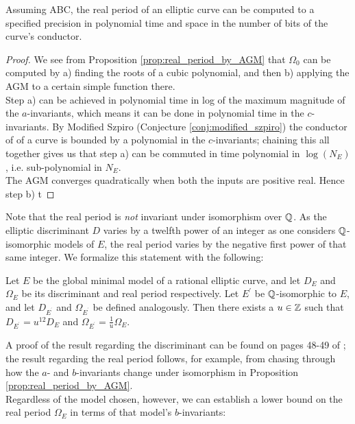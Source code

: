 \documentclass[10pt]{article}
\newcommand{\pr}{^{\prime}}
\begin{document}
\begin{corollary}
Assuming ABC, the real period of an elliptic curve can be computed to a specified precision in polynomial time and space in the number of bits of the curve's conductor.
\end{corollary}
\begin{proof}
We see from Proposition \ref{prop:real_period_by_AGM} that $\Omega_0$ can be computed by a) finding the roots of a cubic polynomial, and then b) applying the AGM to a certain simple function there. \\

Step a) can be achieved in polynomial time in log of the maximum magnitude of the $a$-invariants, which means it can be done in polynomial time in the $c$-invariants. By Modified Szpiro (Conjecture \ref{conj:modified_szpiro}) the conductor of of a curve is bounded by a polynomial in the $c$-invariants; chaining this all together gives us that step a) can be commuted in time polynomial in $\log(N_E)$, i.e. sub-polynomial in $N_E$. \\

The AGM converges quadratically when both the inputs are positive real. Hence step b) t
\end{proof}



Note that the real period is {\it not} invariant under isomorphism over $\mathbb{Q}$. As the elliptic discriminant $D$ varies by a twelfth power of an integer as one considers $\mathbb{Q}$-isomorphic models of $E$, the real period varies by the negative first power of that same integer. We formalize this statement with the following:
\begin{lemma}
Let $E$ be the global minimal model of a rational elliptic curve, and let $D_E$ and $\Omega_E$ be its discriminant and real period respectively. Let $E\pr$ be $\mathbb{Q}$-isomorphic to $E$, and let $D_{E^{\pr}}$ and $\Omega_{E^{\pr}}$ be defined analogously. Then there exists a $u \in \mathbb{Z}$ such that $D_{E^{\pr}}=u^{12} D_E$ and $\Omega_{E^{\pr}}=\frac{1}{u}\Omega_E$.
\end{lemma}
A proof of the result regarding the discriminant can be found on pages 48-49 of \cite{Sil-1985}; the result regarding the real period follows, for example, from chasing through how the $a$- and $b$-invariants change under isomorphism in Proposition \ref{prop:real_period_by_AGM}. \\

Regardless of the model chosen, however, we can establish a lower bound on the real period $\Omega_E$ in terms of that model's $b$-invariants:
\end{document}
